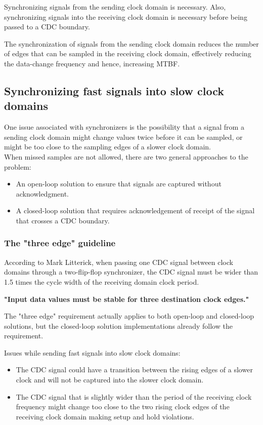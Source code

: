 \par Synchronizing signals from the sending clock domain is necessary. Also, synchronizing signals into the receiving clock domain is necessary before being passed to a CDC boundary. 

\par The synchronization of signals from the sending clock domain reduces the number of edges that can be sampled in the receiving clock domain, effectively reducing the data-change frequency and hence, increasing MTBF.


\subsection{Synchronizing fast signals into slow clock domains}
One issue associated with synchronizers is the possibility that a signal from a sending clock domain might change values twice before it can be sampled, or might be too close to the sampling edges of a slower clock domain. \\ When missed samples are not allowed, there are two general approaches to the problem:
\begin{itemize}
    \item An open-loop solution to ensure that signals are captured without acknowledgment.
    \item A closed-loop solution that requires acknowledgement of receipt of the signal that crosses a CDC boundary.
\end{itemize}

\subsubsection{The "three edge" guideline}
According to Mark Litterick, when passing one CDC signal between clock domains through a two-flip-flop synchronizer, the CDC signal must be wider than 1.5 times the cycle width of the receiving domain clock period.\\ \centerline{\textbf{"Input data values must be stable for three destination clock edges."}}

The "three edge" requirement actually applies to both open-loop and closed-loop solutions, but the closed-loop solution implementations already follow the requirement.

Issues while sending fast signals into slow clock domains: 
\begin{itemize}
	\item The CDC signal could have a transition between the rising edges of a slower clock and will not be captured into the slower clock domain.
	\item The CDC signal that is slightly wider than the period of the receiving clock frequency might change too close to the two rising clock edges of
	the receiving clock domain making setup and hold violations.
\end{itemize}

